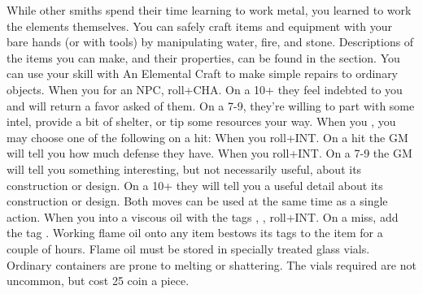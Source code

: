 \documentclass[]{dw_playbook}
\begin{document}
    {
            {While other smiths spend their time learning to work metal, you learned to work the elements themselves.  You can safely craft items and equipment with your bare hands (or with tools) by manipulating water, fire, and stone.  Descriptions of the items you can make, and their properties, can be found in the  section.}
        \gap
            {You can use your skill with An Elemental Craft to make simple repairs to ordinary objects. When you  for an NPC, roll+CHA.  On a 10+ they feel indebted to you and will return a favor asked of them.  On a 7-9, they’re willing to part with some intel, provide a bit of shelter, or tip some resources your way.}
        \gap
            {When you , you may choose one of the following on a hit:
            \gapSm
            \gapSm
            }
            {When you  roll+INT.  On a hit the GM will tell you how much defense they have.
            \gap
            When you  roll+INT.  On a 7-9 the GM will tell you something interesting, but not necessarily useful, about its construction or design.  On a 10+ they will tell you a useful detail about its construction or design.
            \gap
            Both moves can be used at the same time as a single action.}
        \gap
            {When you  into a viscous oil with the tags , , roll+INT.  On a miss, add the tag .  Working flame oil onto any item bestows its tags to the item for a couple of hours.
            \gap
            Flame oil must be stored in specially treated glass vials.  Ordinary containers are prone to melting or shattering.  The vials required are not uncommon, but cost 25 coin a piece.}
    }

\clearpage
~
\end{document}

